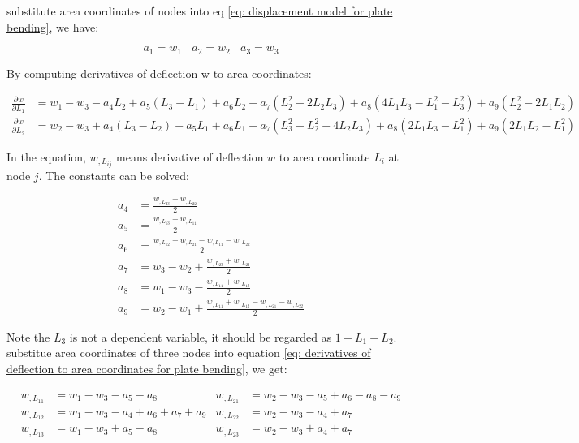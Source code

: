 substitute area coordinates of nodes into eq \ref{eq: displacement model for plate bending}, we have:

\begin{equation} \label{eq: constant terms 1-3}
a_1 = w_1~~~~a_2 = w_2~~~~a_3 = w_3
\end{equation}

By computing derivatives of deflection w to area coordinates:

\begin{equation} \label{eq: derivatives of deflection to area coordinates for plate bending}
\begin{split}
\frac{\partial w}{\partial L_1}	&= w_1 - w_3 - a_4 L_2 + a_5 (L_3-L_1) + a_6 L_2 + a_7(L_2^2-2L_2L_3) + a_8(4L_1 L_3 - L_1^2 - L_3^2) + a_9(L_2^2 - 2L_1 L_2) \\
\frac{\partial w}{\partial L_2}	&= w_2 - w_3 + a_4 (L_3-L_2) - a_5 L_1 + a_6 L_1 + a_7(L_3^2 + L_2^2 - 4L_2 L_3) + a_8(2L_1 L_3 - L_1^2) + a_9(2L_1 L_2 - L_1^2)
\end{split}
\end{equation}

In the equation, $ w_{,L_{ij}} $ means derivative of deflection $ w $ to area coordinate $ L_i $ at node $ j $. The constants can be solved:

\begin{equation} \label{eq: constant terms 4-9}
\begin{split}
a_4 &= \frac{w_{,L_{23}} - w_{,L_{22}}}{2} \\
a_5 &= \frac{w_{,L_{13}} - w_{,L_{11}}}{2} \\
a_6 &= \frac{w_{,L_{12}} + w_{,L_{21}} - w_{,L_{11}} - w_{,L_{22}}}{2} \\
a_7 &= w_3 - w_2 + \frac{w_{,L_{23}} + w_{,L_{22}}}{2} \\
a_8 &= w_1 - w_3 - \frac{w_{,L_{11}} + w_{,L_{13}}}{2} \\
a_9 &= w_2 - w_1 + \frac{w_{,L_{11}} + w_{,L_{12}} - w_{,L_{21}} - w_{,L_{22}}}{2}
\end{split}
\end{equation}

Note the $ L_3 $ is not a dependent variable, it should be regarded as $ 1-L_1 - L_2 $. substitue area coordinates of three nodes into equation \ref{eq: derivatives of deflection to area coordinates for plate bending}, we get:

\begin{align*}
	w_{,L_{11}} &= w_1 - w_3 - a_5 -a_8 & w_{,L_{21}} &= w_2 - w_3 - a_5 + a_6 -a_8 -a_9 \\
	w_{,L_{12}} &= w_1 - w_3 -a_4 + a_6 + a_7 + a_9 & w_{,L_{22}} &= w_2- w_3-a_4+a_7 \\
	w_{,L_{13}} &= w_1 - w_3 + a_5 -a_8 & w_{,L_{23}} &= w_2 - w_3 + a_4 + a_7
\end{align*}

